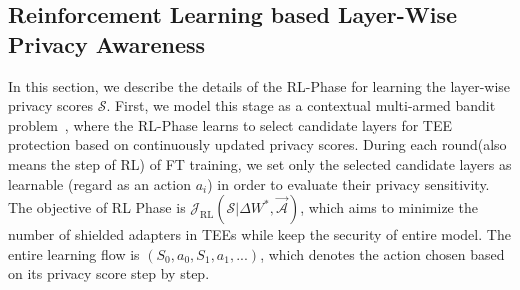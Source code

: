 \documentclass{article}
\begin{document}
\subsection{Reinforcement Learning based Layer-Wise Privacy Awareness}
In this section, we describe the details of the RL-Phase for learning the layer-wise privacy scores $\mathcal{S}$. First, we model this stage as a contextual multi-armed bandit problem~\cite{arulkumaran2017deep}, where the RL-Phase learns to select candidate layers for TEE protection based on continuously updated privacy scores. During each round(also means the step of RL) of FT training, we set only the selected candidate layers as learnable (regard as an action $a_i$) in order to evaluate their privacy sensitivity.
The objective of RL Phase is $\mathcal{J}_\text{RL}(\mathcal{S}|\Delta W^{*},\vec{\mathcal{A}})$, which aims to minimize the number of shielded adapters in TEEs while keep the security of entire model. The entire learning flow is $(S_0,a_0,S_1,a_1,...)$, which denotes the action chosen based on its privacy score step by step. 
\end{document}
